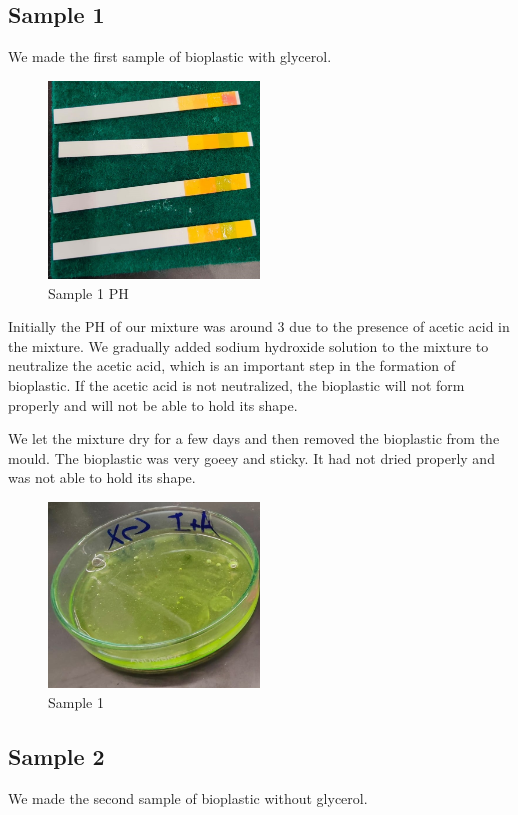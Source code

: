 \documentclass[a4paper, 12pt, english]{article}
\begin{document}
\subsection{Sample 1}
We made the first sample of bioplastic with glycerol.

\begin{figure}[H]
	\centering
	\includegraphics[width=0.5\textwidth]{images/sample1-ph.jpg}
	\caption{Sample 1 PH}
	\label{fig:sample1-ph}
\end{figure}

Initially the PH of our mixture was around 3 due to the presence of acetic acid
in the mixture. We gradually added sodium hydroxide solution to the mixture to
neutralize the acetic acid, which is an important step in the formation of
bioplastic. If the acetic acid is not neutralized, the bioplastic will not form
properly and will not be able to hold its shape.

We let the mixture dry for a few days and then removed the bioplastic from the
mould. The bioplastic was very goeey and sticky. It had not dried properly and
was not able to hold its shape.

\begin{figure}[H]
	\centering
	\includegraphics[width=0.5\textwidth]{images/sample1.jpg}
	\caption{Sample 1}
	\label{fig:sample1}
\end{figure}
\subsection{Sample 2}
We made the second sample of bioplastic without glycerol.
\end{document}
